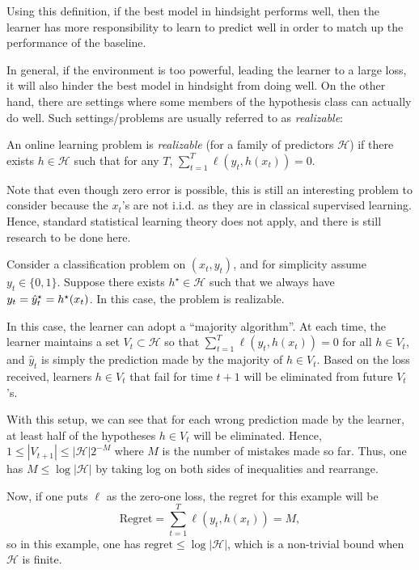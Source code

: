 Using this definition, if the best model in hindsight performs well, then the learner has more responsibility to learn to predict well in order to match up the performance of the baseline.
    
In general, if the environment is too powerful, leading the learner to a large loss, it will also hinder the best model in hindsight from doing well. On the other hand, there are settings where some members of the hypothesis class can actually do well. Such settings/problems are usually referred to as \textit{realizable}:

\begin{definition}
An online learning problem is \textit{realizable} (for a family of predictors $\mathcal{H}$) if there exists $h \in \mathcal{H}$ such that for any $T$, $\sum_{t = 1}^T \ell(y_t, h(x_t)) = 0$.
\end{definition}

Note that even though zero error is possible, this is still an interesting problem to consider because the $x_t$'s are not i.i.d. as they are in classical supervised learning. Hence, standard statistical learning theory does not apply, and there is still research to be done here.

\begin{example}
Consider a classification problem on $(x_t, y_t)$, and for simplicity assume $y_t \in \{0, 1\}$. Suppose there exists $h^\star \in \mathcal{H}$ such that we always have $y_t = \hat{y}^\star_t = h^\star(x_t)$. In this case, the problem is realizable. 
    
In this case, the learner can adopt a ``majority algorithm''. At each time, the learner maintains a set $V_t \subset \mathcal{H}$ so that $\sum_{t=1}^T \ell (y_t, h(x_t)) = 0$ for all $h \in V_t$, and $\hat{y}_t$ is simply the prediction made by the majority of $h \in V_t$. Based on the loss received, learners $h \in V_t$ that fail for time $t + 1$ will be eliminated from future $V_t$'s.
    
With this setup, we can see that for each wrong prediction made by the learner, at least half of the hypotheses $h \in V_t$ will be eliminated. Hence, $1 \leq |V_{t+1}| \leq |\mathcal{H}|2^{-M}$ where $M$ is the number of mistakes made so far. Thus, one has $M \leq \log |\mathcal{H}|$ by taking log on both sides of inequalities and rearrange.
    
Now, if one puts $\ell$ as the zero-one loss, the regret for this example will be
\begin{equation}
\text{Regret} = \sum_{t=1}^T \ell(y_t, h(x_t)) = M,
\end{equation}
so in this example, one has $\text{regret} \leq \log |\mathcal{H}|$, which is a non-trivial bound when $\mathcal{H}$ is finite.
\end{example}
    
